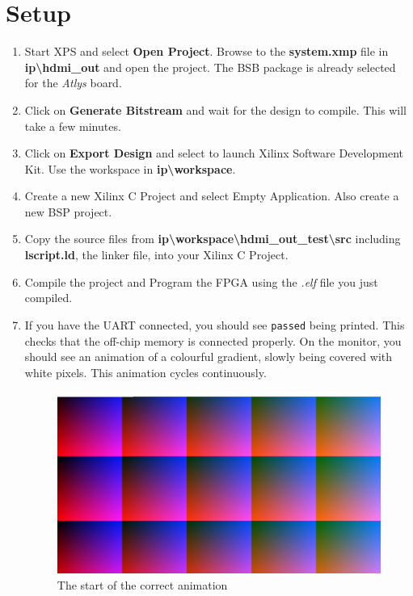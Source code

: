 \documentclass[12pt]{article}
\begin{document}
  \section{Setup}
  \begin{enumerate}
    \item Start XPS and select \textbf {Open Project}. Browse to the \textbf {system.xmp} file in \textbf {ip\textbackslash{}hdmi\_out} and open the project. The BSB package is already selected for the \textit {Atlys} board.
    \item Click on \textbf {Generate Bitstream} and wait for the design to compile. This will take a few minutes.
    \item Click on \textbf {Export Design} and select to launch Xilinx Software Development Kit. Use the workspace in \textbf {ip\textbackslash{}workspace}.
    \item Create a new Xilinx C Project and select Empty Application. Also create a new BSP project.
    \item Copy the source files from \textbf {ip\textbackslash{}workspace\textbackslash{}hdmi\_out\_test\textbackslash{}src} including \textbf {lscript.ld}, the linker file, into your Xilinx C Project.
    \item Compile the project and Program the FPGA using the \textit {.elf} file you just compiled.
    \item If you have the UART connected, you should see \texttt {passed} being printed. This checks that the off-chip memory is connected properly. On the monitor, you should see an animation of a colourful gradient, slowly being covered with white pixels. This animation cycles continuously.
      \begin{figure}[h!]
        \centering
        \includegraphics[width=6in]{ref1.jpg}
        \caption{The start of the correct animation}

\end{figure}
\end{enumerate}
\end{document}

